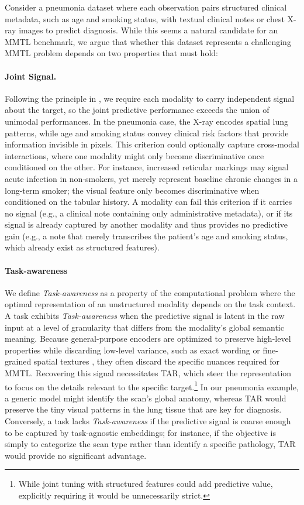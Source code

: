 \documentclass{llmxive}
\begin{document}
Consider a pneumonia dataset where each observation pairs structured clinical metadata, such as age and smoking status, with textual clinical notes or chest X-ray images to predict diagnosis.
While this seems a natural candidate for an MMTL benchmark, we argue that whether this dataset represents a challenging MMTL problem depends on two properties that must hold:

\paragraph{Joint Signal.} Following the principle in \citet{mraz_towards_2025}, we require each modality to carry independent signal about the target, so the joint predictive performance exceeds the union of unimodal performances. In the pneumonia case, the X-ray encodes spatial lung patterns, while age and smoking status convey clinical risk factors that provide information invisible in pixels. This criterion could optionally capture cross-modal interactions, where one modality might only become discriminative once conditioned on the other. For instance, increased reticular markings may signal acute infection in non-smokers, yet merely represent baseline chronic changes in a long-term smoker; the visual feature only becomes discriminative when conditioned on the tabular history. A modality can fail this criterion if it carries no signal (e.g., a clinical note containing only administrative metadata), or if its signal is already captured by another modality and thus provides no predictive gain (e.g., a note that merely transcribes the patient's age and smoking status, which already exist as structured features).

\paragraph{Task-awareness} We define \textit{Task-awareness} as a property of the computational problem where the optimal representation of an unstructured modality depends on the task context. A task exhibits \textit{Task-awareness} when the predictive signal is latent in the raw input at a level of granularity that differs from the modality's global semantic meaning. Because general-purpose encoders are optimized to preserve high-level properties while discarding low-level variance, such as exact wording \cite{weller_theoretical_2025} or fine-grained spatial textures \cite{pantazopoulos_lost_2024}, they often discard the specific nuances required for MMTL. Recovering this signal necessitates TAR, which steer the representation to focus on the details relevant to the specific target.\footnote{While joint tuning with structured features could add predictive value, explicitly requiring it would be unnecessarily strict.} In our pneumonia example, a generic model might identify the scan's global anatomy, whereas TAR would preserve the tiny visual patterns in the lung tissue that are key for diagnosis. Conversely, a task lacks \textit{Task-awareness} if the predictive signal is coarse enough to be captured by task-agnostic embeddings; for instance, if the objective is simply to categorize the scan type rather than identify a specific pathology, TAR would provide no significant advantage. 
\end{document}
